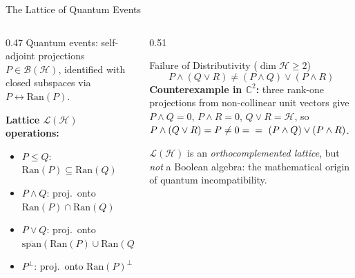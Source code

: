 \documentclass{beamer}
\newcommand{\Hilb}{\mathcal{H}}
\newcommand{\Bound}{\mathcal{B}}
\begin{document}
\begin{frame}[shrink=10]{The Lattice of Quantum Events}
  \begin{columns}[T]
    \begin{column}{0.47\textwidth}
    \justifying
      Quantum events: self-adjoint projections $P\in\Bound(\Hilb)$,
      identified with closed subspaces via $P\leftrightarrow\mathrm{Ran}(P)$.

      \vspace{0.3em}
      \textbf{Lattice $\mathcal{L}(\Hilb)$ operations:}
      \begin{itemize}
        \item $P\le Q$: $\mathrm{Ran}(P)\subseteq\mathrm{Ran}(Q)$
        \item $P\wedge Q$: proj.\ onto $\mathrm{Ran}(P)\cap\mathrm{Ran}(Q)$
        \item $P\vee Q$: proj.\ onto $\overline{\mathrm{span}}(\mathrm{Ran}(P)\cup\mathrm{Ran}(Q))$
        \item $P^\perp$: proj.\ onto $\mathrm{Ran}(P)^\perp$
      \end{itemize}
    \end{column}
    \begin{column}{0.51\textwidth}
      \begin{alertblock}{Failure of Distributivity ($\dim\Hilb\ge 2$)}
        \[
          P\wedge(Q\vee R) \ne (P\wedge Q)\vee(P\wedge R)
        \]
        \textbf{Counterexample in $\mathbb{C}^2$:}
        \justifying
        three rank-one projections from
        non-collinear unit vectors give $P\wedge Q=0$, $P\wedge R=0$, $Q\vee R=\Hilb$,
        so $P\wedge(Q\vee R)=P\ne 0=\\
        =\ (P\wedge Q)\vee(P\wedge R)$.
      \end{alertblock}
      \justifying
      \small $\mathcal{L}(\Hilb)$ is an \emph{orthocomplemented lattice}, but \emph{not} a
      Boolean algebra: the mathematical origin of quantum incompatibility.
    \end{column}
  \end{columns}
\end{frame}
\end{document}
